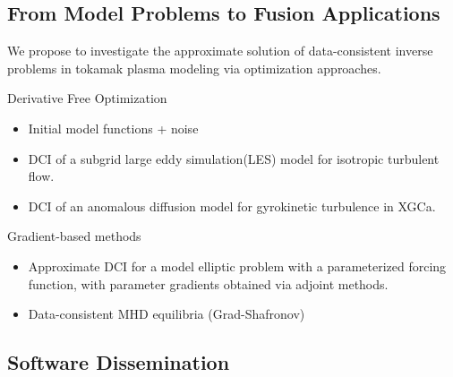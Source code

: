 \documentclass[11pt]{beamer}
\begin{document}
\subsection{From Model Problems to Fusion Applications}

\begin{frame}

We propose to investigate the approximate solution of data-consistent inverse problems in tokamak plasma modeling via optimization approaches.

\begin{block}{Derivative Free Optimization}
\begin{itemize}
	\item Initial model functions + noise
        \item  DCI of a subgrid large eddy simulation(LES) model for isotropic turbulent flow.  
        \item DCI of an anomalous diffusion model for gyrokinetic turbulence in XGCa.
        \end{itemize}
\end{block}

\begin{block}{Gradient-based methods}
\begin{itemize}
	\item Approximate DCI for a model elliptic problem with a parameterized forcing function, with parameter gradients obtained via adjoint methods.  
	\item Data-consistent MHD equilibria (Grad-Shafronov)
\end{itemize}
\end{block}


\end{frame}

\subsection{Software Dissemination}
\end{document}
